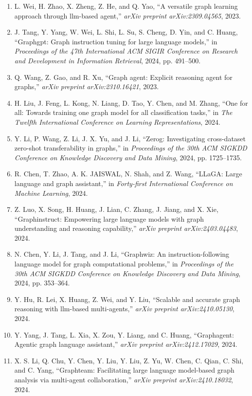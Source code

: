 \documentclass[10pt,UTF8,fontset=fandol]{ctexart}
\begin{document}
\begin{enumerate}[leftmargin=2.4em,labelsep=0.4em,itemsep=0.15em]
\item L. Wei, H. Zhao, X. Zheng, Z. He, and Q. Yao, ``A versatile graph learning approach through llm-based agent,'' \textit{arXiv preprint arXiv:2309.04565}, 2023.
\item J. Tang, Y. Yang, W. Wei, L. Shi, L. Su, S. Cheng, D. Yin, and C. Huang, ``Graphgpt: Graph instruction tuning for large language models,'' in \textit{Proceedings of the 47th International ACM SIGIR Conference on Research and Development in Information Retrieval}, 2024, pp. 491--500.
\item Q. Wang, Z. Gao, and R. Xu, ``Graph agent: Explicit reasoning agent for graphs,'' \textit{arXiv preprint arXiv:2310.16421}, 2023.
\item H. Liu, J. Feng, L. Kong, N. Liang, D. Tao, Y. Chen, and M. Zhang, ``One for all: Towards training one graph model for all classification tasks,'' in \textit{The Twelfth International Conference on Learning Representations}, 2024.
\item Y. Li, P. Wang, Z. Li, J. X. Yu, and J. Li, ``Zerog: Investigating cross-dataset zero-shot transferability in graphs,'' in \textit{Proceedings of the 30th ACM SIGKDD Conference on Knowledge Discovery and Data Mining}, 2024, pp. 1725--1735.
\item R. Chen, T. Zhao, A. K. JAISWAL, N. Shah, and Z. Wang, ``LLaGA: Large language and graph assistant,'' in \textit{Forty-first International Conference on Machine Learning}, 2024.
\item Z. Luo, X. Song, H. Huang, J. Lian, C. Zhang, J. Jiang, and X. Xie, ``Graphinstruct: Empowering large language models with graph understanding and reasoning capability,'' \textit{arXiv preprint arXiv:2403.04483}, 2024.
\item N. Chen, Y. Li, J. Tang, and J. Li, ``Graphwiz: An instruction-following language model for graph computational problems,'' in \textit{Proceedings of the 30th ACM SIGKDD Conference on Knowledge Discovery and Data Mining}, 2024, pp. 353--364.
\item Y. Hu, R. Lei, X. Huang, Z. Wei, and Y. Liu, ``Scalable and accurate graph reasoning with llm-based multi-agents,'' \textit{arXiv preprint arXiv:2410.05130}, 2024.
\item Y. Yang, J. Tang, L. Xia, X. Zou, Y. Liang, and C. Huang, ``Graphagent: Agentic graph language assistant,'' \textit{arXiv preprint arXiv:2412.17029}, 2024.
\item X. S. Li, Q. Chu, Y. Chen, Y. Liu, Y. Liu, Z. Yu, W. Chen, C. Qian, C. Shi, and C. Yang, ``Graphteam: Facilitating large language model-based graph analysis via multi-agent collaboration,'' \textit{arXiv preprint arXiv:2410.18032}, 2024.

\end{enumerate}
\end{document}
